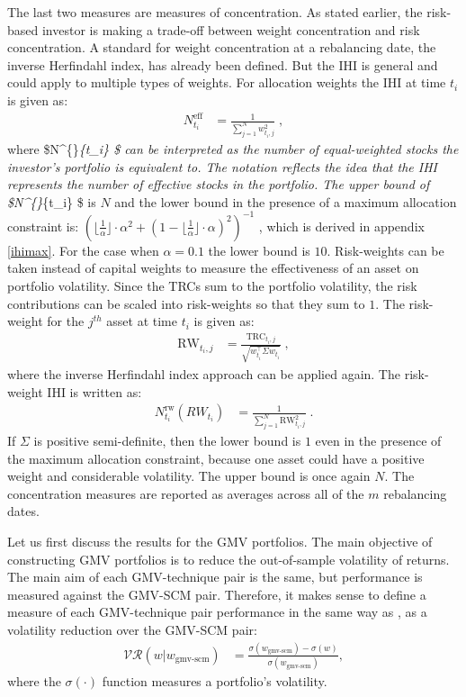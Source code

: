 \documentclass[
]{article}
\begin{document}
The last two measures are measures of concentration. As stated earlier, the risk-based investor is
making a trade-off between weight concentration and risk concentration. A standard for weight
concentration at a rebalancing date, the inverse Herfindahl index, has already been defined. But the
IHI is general and could apply to multiple types of weights. For allocation weights the IHI at time
\(t_i\) is given as:
\begin{align}
N^{\text{eff}}_{t_i} &= \frac{1}{\sum_{j = 1}^N w_{t_i, j}^2} \; ,
\end{align}
where \$N\^{}\{\}\emph{\{t\_i\} \$ can be interpreted as the number of equal-weighted stocks the investor's
portfolio is equivalent to. The notation reflects the idea that the IHI represents the number of
effective stocks in the portfolio. The upper bound of \$N\^{}\{\}}\{t\_i\} \$ is \(N\) and the lower
bound in the presence of a maximum allocation constraint is:
\(({\lfloor \frac{1}{\alpha} \rfloor \cdot \alpha^2 + (1- \lfloor \frac{1}{\alpha}\rfloor \cdot \alpha)^2})^{-1}\)
, which is derived in appendix \ref{ihimax}. For the case when \(\alpha = 0.1\) the lower bound is
\(10\). Risk-weights can be taken instead of capital weights to measure the effectiveness of an asset on
portfolio volatility. Since the TRCs sum to the portfolio volatility, the risk contributions can be
scaled into risk-weights so that they sum to \(1\). The risk-weight for the \(j^{th}\) asset at time \(t_i\)
is given as:
\begin{align}
\text{RW}_{t_i, j} &= \frac{\text{TRC}_{t_i, j}}{\sqrt{w_{t_i}^\intercal \Sigma w_{t_i}}}\; ,
 \end{align}
where the inverse Herfindahl index approach can be applied again. The risk-weight IHI is written as:
\begin{align}
N^\mathrm{rw}_{t_i}(RW_{t_i}) &= \frac{1}{\sum_{j = 1}^N \text{RW}_{t_i, j}^2} \;.
\end{align}
If \(\Sigma\) is positive semi-definite, then the lower bound is \(1\) even in the presence of the maximum
allocation constraint, because one asset could have a positive weight and considerable volatility. The
upper bound is once again \(N\). The concentration measures are reported as averages across all of the
\(m\) rebalancing dates.

Let us first discuss the results for the GMV portfolios. The main objective of constructing GMV
portfolios is to reduce the out-of-sample volatility of returns. The main aim of each GMV-technique
pair is the same, but performance is measured against the GMV-SCM pair. Therefore, it makes sense to
define a measure of each GMV-technique pair performance in the same way as \citet{RR15}, as a
volatility reduction over the GMV-SCM pair:
\begin{align}
\mathcal{VR}(w|w_{\text{gmv-scm}}) & = \frac{\sigma(w_{\text{gmv-scm}}) - \sigma(w)}{\sigma(w_{\text{gmv-scm}})},
\end{align}
where the \(\sigma(\cdot)\) function measures a portfolio's volatility.
\end{document}
